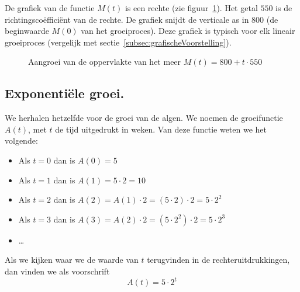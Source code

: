 De grafiek van de functie $M(t)$ is een rechte (zie figuur~\ref{fig:lingroei}). Het getal $550$ is de richtingsco\"effici\"ent van de rechte. De grafiek snijdt de verticale as in $800$ (de beginwaarde $M(0)$ van het groeiproces).   Deze grafiek is typisch voor elk lineair groeiproces (vergelijk met sectie~\ref{subsec:grafischeVoorstelling}).
\begin{figure}[tbp]
    \centering
{}
    \caption{Aangroei van de oppervlakte van het meer $M(t)=800+t\cdot 550$}
    \label{fig:lingroei}
\end{figure}

\subsection{Exponenti\"{e}le groei.}
\label{subsec: exp_groei_vb}
We herhalen hetzelfde voor de groei van de algen. We
noemen de groeifunctie $A(t)$,
met $t$ de tijd uitgedrukt in weken.
Van deze functie weten we het volgende:
\begin{itemize}
    \item  Als $t=0$ dan is $A(0)=5$

    \item  Als $t=1$ dan is $A(1)=5\cdot 2=10$

    \item  Als $t=2$ dan is $A(2)=A(1)\cdot 2=(5\cdot 2)\cdot 2=5\cdot 2^{2}$

    \item  Als $t=3$ dan is $A(3)=A(2)\cdot 2=(5\cdot 2^{2})\cdot 2=5\cdot 2^{3}$

    \item  \ldots
\end{itemize}
Als we kijken waar we de waarde van $t$ terugvinden in de
rechteruitdrukkingen, dan vinden we als voorschrift
\begin{equation}
    A(t)=5\cdot 2^{t}
    \label{eq:algen}
\end{equation}


